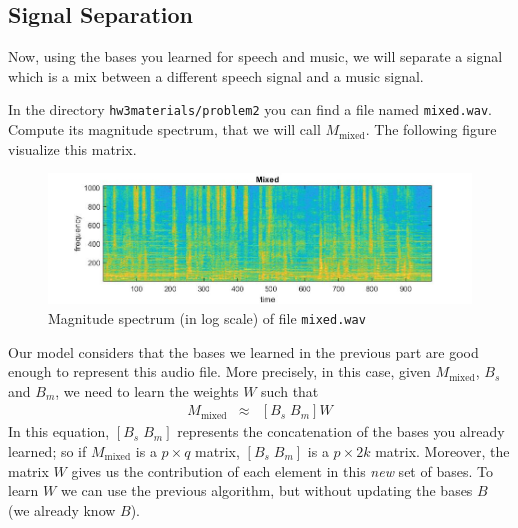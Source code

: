 \subsection{Signal Separation}

Now, using the bases you learned for speech and music, we will separate a signal which is a mix between a different speech signal and a music signal.

In the directory \texttt{hw3materials/problem2} you can find a file named \texttt{mixed.wav}. Compute its magnitude spectrum, that we will call $M_{\text{mixed}}$. The following figure visualize this matrix.

\begin{figure}[h!]
    \centering
    \includegraphics[trim ={0cm 0 0 0 }, scale=0.3]{figs/mixed.jpg}
    \caption{Magnitude spectrum (in log scale) of file \texttt{mixed.wav}}
\end{figure}



Our model considers that the bases we learned in the previous part are good enough to represent this audio file. More precisely, in this case, given $M_{\text{mixed}}$, $B_s$ and $B_m$, we need to learn the weights $W$ such that
\begin{eqnarray}
    M_{\text{mixed}} & \approx & [B_s \; B_m] W 
\end{eqnarray}
 In this equation, $[B_s \; B_m]$ represents the concatenation of the bases you already learned; so if $M_{\text{mixed}}$ is a $p \times q$ matrix, $[B_s \; B_m]$ is a $p \times 2k$ matrix. Moreover, the matrix $W$ gives us the contribution of each element in this \textit{new} set of bases. 
 To learn $W$ we can use the previous algorithm, but without updating the bases $B$ (we already know $B$).
 

